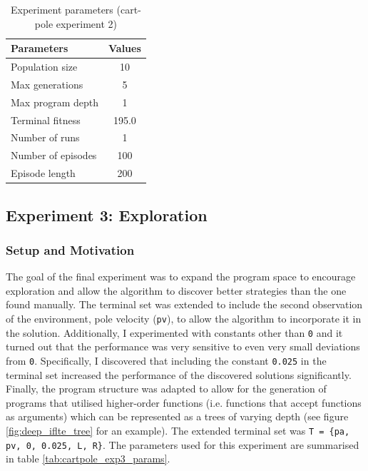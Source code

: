 \begin{table}[ht]
    \centering
    \begin{tabular}{|l|c|}
        \hline
        \textbf{Parameters} & \textbf{Values} \\
        \hline
        Population size     & 10  \\
        Max generations     & 5   \\
        Max program depth   & 1  \\
        Terminal fitness & 195.0 \\
        Number of runs      & 1   \\
        Number of episodes  & 100 \\
        Episode length      & 200  \\
        \hline
    \end{tabular}
    \caption{Experiment parameters (cart-pole experiment 2)}
    \label{tab:cartpole_exp2_params}
\end{table}

\subsection{Experiment 3: Exploration}
\subsubsection{Setup and Motivation}
The goal of the final experiment was to expand the program space to encourage exploration and allow the algorithm to discover better strategies than the one found manually. The terminal set was extended to include the second observation of the environment, pole velocity (\verb+pv+), to allow the algorithm to incorporate it in the solution. Additionally, I experimented with constants other than \verb+0+ and it turned out that the performance was very sensitive to even very small deviations from \verb+0+. Specifically, I discovered that including the constant \verb+0.025+ in the terminal set increased the performance of the discovered solutions significantly. Finally, the program structure was adapted to allow for the generation of programs that utilised higher-order functions (i.e. functions that accept functions as arguments) which can be represented as a trees of varying depth (see figure \ref{fig:deep_iflte_tree} for an example). The extended terminal set was \verb+T = {pa, pv, 0, 0.025, L, R}+. The parameters used for this experiment are summarised in table \ref{tab:cartpole_exp3_params}.

